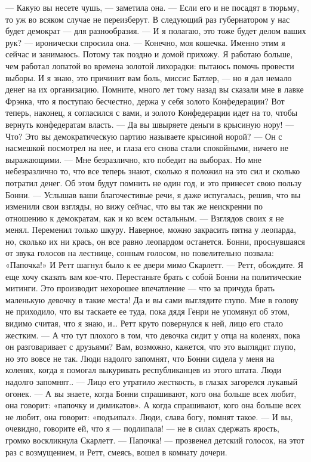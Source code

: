 — Какую вы несете чушь, — заметила она.
— Если его и не посадят в тюрьму, то уж во всяком случае не переизберут. В следующий раз губернатором у нас будет демократ — для разнообразия.
— И я полагаю, это тоже будет делом ваших рук? — иронически спросила она.
— Конечно, моя кошечка. Именно этим я сейчас и занимаюсь. Потому так поздно и домой прихожу. Я работаю больше, чем работал лопатой во времена золотой лихорадки: пытаюсь помочь провести выборы. И я знаю, это причинит вам боль, миссис Батлер, — но я дал немало денег на их организацию. Помните, много лет тому назад вы сказали мне в лавке Фрэнка, что я поступаю бесчестно, держа у себя золото Конфедерации? Вот теперь, наконец, я согласился с вами, и золото Конфедерации идет на то, чтобы вернуть конфедератам власть.
— Да вы швыряете деньги в крысиную нору!
— Что? Это вы демократическую партию называете крысиной норой? — Он с насмешкой посмотрел на нее, и глаза его снова стали спокойными, ничего не выражающими. — Мне безразлично, кто победит на выборах. Но мне небезразлично то, что все теперь знают, сколько я положил на это сил и сколько потратил денег. Об этом будут помнить не один год, и это принесет свою пользу Бонни.
— Услышав ваши благочестивые речи, я даже испугалась, решив, что вы изменили свои взгляды, но вижу сейчас, что вы так же неискренни по отношению к демократам, как и ко всем остальным.
— Взглядов своих я не менял. Переменил только шкуру. Наверное, можно закрасить пятна у леопарда, но, сколько их ни крась, он все равно леопардом останется.
Бонни, проснувшаяся от звука голосов на лестнице, сонным голосом, но повелительно позвала: «Папочка!» И Ретт шагнул было к ее двери мимо Скарлетт.
— Ретт, обождите. Я еще хочу сказать вам кое-что. Перестаньте брать с собой Бонни на политические митинги. Это производит нехорошее впечатление — что за причуда брать маленькую девочку в такие места! Да и вы сами выглядите глупо. Мне в голову не приходило, что вы таскаете ее туда, пока дядя Генри не упомянул об этом, видимо считая, что я знаю, и…
Ретт круто повернулся к ней, лицо его стало жестким.
— А что тут плохого в том, что девочка сидит у отца на коленях, пока он разговаривает с друзьями? Вам, возможно, кажется, что это выглядит глупо, но это вовсе не так. Люди надолго запомнят, что Бонни сидела у меня на коленях, когда я помогал выкуривать республиканцев из этого штата. Люди надолго запомнят.. — Лицо его утратило жесткость, в глазах загорелся лукавый огонек. — А вы знаете, когда Бонни спрашивают, кого она больше всех любит, она говорит: «папочку и димикатов». А когда спрашивают, кого она больше всех не любит, она говорит: «подъипал». Люди, слава богу, помнят такое.
— И вы, очевидно, говорите ей, что я — подлипала! — не в силах сдержать ярость, громко воскликнула Скарлетт.
— Папочка! — прозвенел детский голосок, на этот раз с возмущением, и Ретт, смеясь, вошел в комнату дочери.




